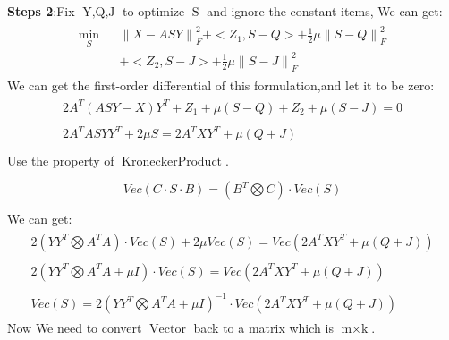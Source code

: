 \documentclass{article}
\begin{document}
\begin{flushleft}
\textbf{Steps 2}:\;\;Fix $\mathop{Y,Q,J}$ to optimize $\mathop{S}$ and ignore the constant items, We can get:
\begin{eqnarray}
\begin{array}{lll}
    \mathop{\min}\limits_{S} && {\parallel X - ASY\parallel}_F^2 + <Z_1,S-Q> + \frac{1}{2}\mu{\parallel S - Q\parallel}_F^2 \\ &&+ <Z_2,S-J> + \frac{1}{2}\mu{\parallel S - J \parallel}_F^2
\end{array}
\end{eqnarray}
We can get the first-order differential of this formulation,and let it to be zero:
\begin{eqnarray}
\begin{array}{lll}
    2A^T(ASY - X)Y^T +Z_1 + \mu (S-Q) + Z_2 + \mu(S-J)= 0 \nonumber \\\\
    2A^TASYY^T + 2\mu S = 2A^TXY^T + \mu (Q+J)
\\
\end{array}
\end{eqnarray}
Use the property of $\mathop{Kronecker Product}$.
\begin{eqnarray}
\begin{array}{lll}
\\
    Vec(C\cdot S\cdot B) = (B^T \bigotimes C)\cdot Vec(S) \nonumber
\\
\end{array}
\end{eqnarray}
We can get:
\begin{eqnarray}
\begin{array}{lll}
    2(YY^T \bigotimes A^TA)\cdot Vec(S) + 2\mu Vec(S)  = Vec(2A^TXY^T + \mu (Q+J)) \nonumber\\\\
    2(YY^T \bigotimes A^TA + \mu I)\cdot Vec(S) = Vec(2A^TXY^T + \mu (Q+J))  \nonumber  \\\\
    Vec(S) = 2(YY^T \bigotimes A^TA + \mu I)^{-1}\cdot Vec(2A^TXY^T + \mu (Q+J))
\end{array}
\end{eqnarray}
Now We need to convert $\mathop{Vector(S)}$ back to a matrix which is $\mathop{m\times k}$.
\end{flushleft}
\end{document}
